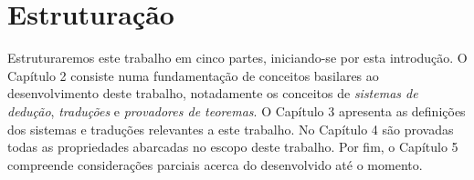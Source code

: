     \section{Estruturação}
    Estruturaremos este trabalho em cinco partes, iniciando-se por esta introdução. O Capítulo 2 consiste numa fundamentação de conceitos basilares ao desenvolvimento deste trabalho, notadamente os conceitos de \emph{sistemas de dedução}, \emph{traduções} e \emph{provadores de teoremas}. O Capítulo 3 apresenta as definições dos sistemas e traduções relevantes a este trabalho. No Capítulo 4 são provadas todas as propriedades abarcadas no escopo deste trabalho. Por fim, o Capítulo 5 compreende considerações parciais acerca do desenvolvido até o momento.